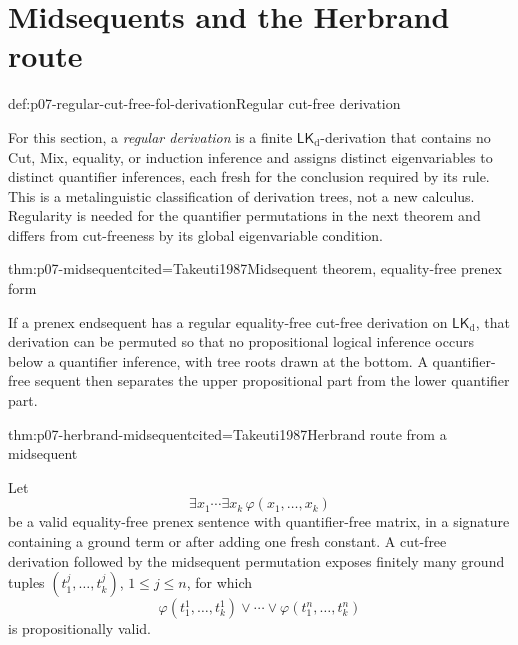 
\section{Midsequents and the Herbrand route}

\begin{hbdefinition}{def:p07-regular-cut-free-fol-derivation}{Regular cut-free derivation}
\par\noindent
For this section, a \emph{regular derivation} is a
finite \(\mathsf{LK}_{\mathrm d}\)-derivation that contains no Cut, Mix,
equality, or induction inference and assigns distinct eigenvariables to
distinct quantifier inferences, each fresh for the conclusion required by its
rule.  This is a metalinguistic classification of derivation trees, not a new
calculus.  Regularity is needed for the quantifier permutations in the next
theorem and differs from cut-freeness by its global eigenvariable condition.
\end{hbdefinition}

\begin{hbtheorem}{thm:p07-midsequent}{cited=Takeuti1987}{Midsequent theorem, equality-free prenex form}
\par\noindent
If a prenex endsequent has a regular equality-free cut-free derivation on
\(\mathsf{LK}_{\mathrm d}\), that derivation can be permuted so that no
propositional logical inference occurs below a quantifier inference, with
tree roots drawn at the bottom.  A quantifier-free sequent then separates the
upper propositional part from the lower quantifier part.
\end{hbtheorem}

\begin{hbtheorem}{thm:p07-herbrand-midsequent}{cited=Takeuti1987}{Herbrand route from a midsequent}
\par\noindent
Let
\[
 \exists x_1\cdots\exists x_k\,\varphi(x_1,\ldots,x_k)
\]
be a valid equality-free prenex sentence with quantifier-free matrix, in a
signature containing a ground term or after adding one fresh constant.  A cut-free
derivation followed by the midsequent permutation exposes finitely many
ground tuples \((t_1^j,\ldots,t_k^j)\), \(1\leq j\leq n\), for which
\[
 \varphi(t_1^1,\ldots,t_k^1)\lor\cdots\lor
 \varphi(t_1^n,\ldots,t_k^n)
\]
is propositionally valid.
\end{hbtheorem}

